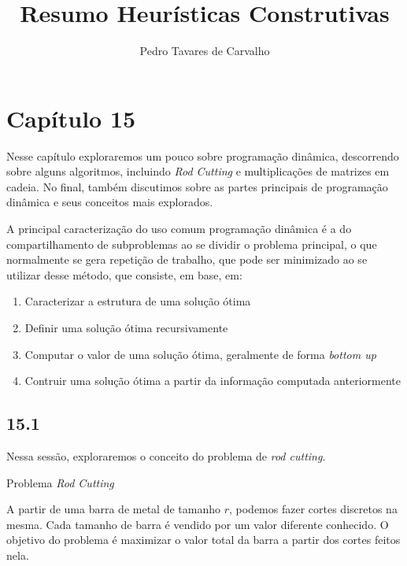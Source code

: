 \documentclass{article}
\title{Resumo Heurísticas Construtivas}
\author{Pedro Tavares de Carvalho}
\theoremstyle{mytheoremstyle}
\theoremstyle{mytheoremstyle}
\theoremstyle{myproblemstyle}
\begin{document}
    \maketitle
    \section{Capítulo 15} %

    \label{sec:Capítulo 15}
        Nesse capítulo exploraremos um pouco sobre programação dinâmica, descorrendo sobre alguns algoritmos,
        incluindo \emph{Rod Cutting} e multiplicações de matrizes em cadeia. No final, também discutimos sobre
        as partes principais de programação dinâmica e seus conceitos mais explorados.

        A principal caracterização do uso comum programação dinâmica é a do compartilhamento de subproblemas ao se dividir
        o problema principal, o que normalmente se gera repetição de trabalho, que pode ser minimizado ao se utilizar desse método,
        que consiste, em base, em:

        \begin{enumerate}
            \item Caracterizar a estrutura de uma solução ótima
            \item Definir uma solução ótima recursivamente
            \item Computar o valor de uma solução ótima, geralmente de forma \emph{bottom up}
            \item Contruir uma solução ótima a partir da informação computada anteriormente
        \end{enumerate}

        \subsection{15.1} %
        \label{sub:15.1}
            Nessa sessão, exploraremos o conceito do problema de \emph{rod cutting}.
            \begin{definition}
                Problema \emph{Rod Cutting}

                A partir de uma barra de metal de tamanho $r$, podemos fazer cortes discretos na mesma.
                Cada tamanho de barra é vendido por um valor diferente conhecido. O objetivo do problema é
                maximizar o valor total da barra a partir dos cortes feitos nela.

            \end{definition}
\end{document}
